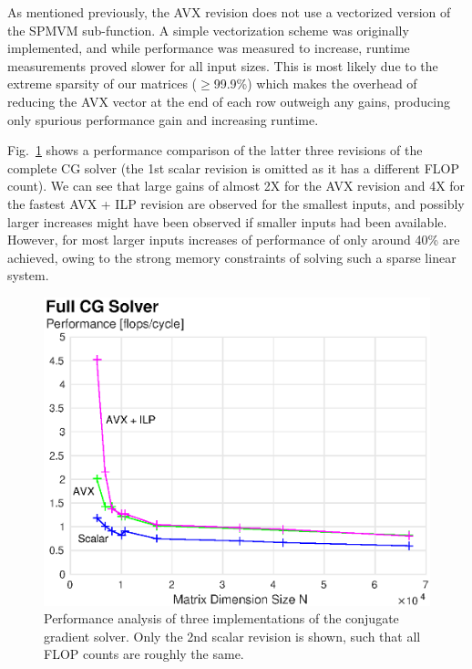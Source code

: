\documentclass[letterpaper]{article}
\begin{document}
As mentioned previously, the AVX revision does not use a vectorized version of the SPMVM sub-function. A simple vectorization scheme was originally implemented, and while performance was measured to increase, runtime measurements proved slower for all input sizes. This is most likely due to the extreme sparsity of our matrices ($\geq$99.9\%) which makes the overhead of reducing the AVX vector at the end of each row outweigh any gains, producing only spurious performance gain and increasing runtime.

Fig.~\ref{perf_solver} shows a performance comparison of the latter three revisions of the complete CG solver (the 1st scalar revision is omitted as it has a different FLOP count). We can see that large gains of almost 2X for the AVX revision and 4X for the fastest AVX + ILP revision are observed for the smallest inputs, and possibly larger increases might have been observed if smaller inputs had been available. However, for most larger inputs increases of performance of only around 40\% are achieved, owing to the strong memory constraints of solving such a sparse linear system.

\begin{figure}[H]\centering
  \includegraphics[scale=0.67]{./plots/perf_solver.eps}
  \caption{Performance analysis of three implementations of the
  conjugate gradient solver. Only the 2nd scalar revision is shown, such that all FLOP counts are roughly the same.\label{perf_solver}}
\end{figure}
\end{document}
